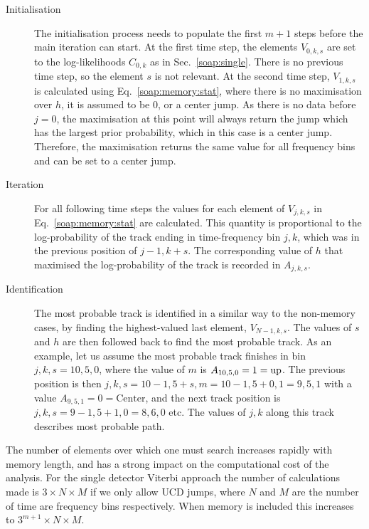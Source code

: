 \begin{description}
\item [Initialisation] The initialisation process needs to populate the first $m+1$ steps before the main iteration can start. At the first time step, the elements $V_{0,k,s}$ are set to the log-likelihoods $C_{0,k}$ as in Sec.~\ref{soap:single}.  There is no previous time step, so the element $s$ is not relevant. At the second time step, $V_{1,k,s}$ is calculated using Eq.~\ref{soap:memory:stat}, where there is no maximisation over $h$, it is assumed to be $0$, or a center jump. As there is no data before $j=0$, the maximisation at this point will always return the jump which has the largest prior probability, which in this case is a center jump. Therefore, the maximisation returns the same value for all frequency bins and can be set to a center jump.

\item [Iteration] For all following time steps the values for each element of $V_{j,k,s}$ in Eq.~\ref{soap:memory:stat} are calculated. This quantity is proportional to the log-probability of the track ending in time-frequency bin $j,k$, which was in the previous position of $j-1,k+s$. The corresponding value of $h$ that maximised the log-probability of the track is recorded in $A_{j,k,s}$.

\item [Identification] The most probable track is identified in a similar way to the non-memory cases, by finding the highest-valued last element, $V_{N-1,k,s}$. The values of $s$ and $h$ are then followed back to find the most probable track. As an example, let us assume the most probable track finishes in bin $j,k,s = 10,5,0$, where the value of $m$ is $A_{10,5,0} = 1 = \rm{up}$. The previous position is then $j,k,s=10-1,5+s,m =10-1,5+0,1=9,5,1$ with a value $A_{9,5,1} = 0 = \text{Center}$, and the next track position is $j,k,s=9-1,5+1,0=8,6,0$ etc. The values of $j,k$ along this track describes most probable path.
%
\end{description}

The number of elements over which one must search increases rapidly with memory length, and has a strong impact on the computational cost of the analysis. For the single detector Viterbi approach the number of calculations made is $3 \times N \times M$ if we only allow \gls{UCD} jumps, where $N$ and $M$ are the number of time are frequency bins respectively. When memory is included this increases to $3^{m+1} \times N \times M $.

